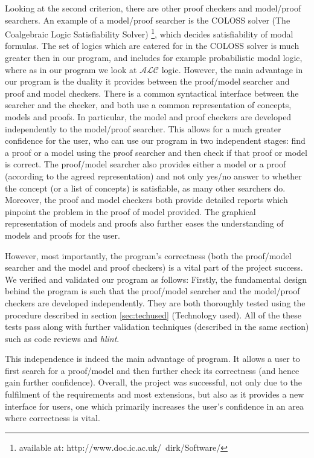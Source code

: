 


Looking at the second criterion, there are other proof checkers and model/proof searchers. An example of a model/proof searcher is the COLOSS solver (The Coalgebraic Logic Satisfiability Solver) \footnote{available at: http://www.doc.ic.ac.uk/~dirk/Software/}, which decides satisfiability of modal formulas. The set of logics which are catered for in the COLOSS solver is much greater then in our program, and includes for example probabilistic modal logic, where as in our program we look at $\mathcal{ALC}$ logic. However, the main advantage in our program is the duality it provides between the proof/model searcher and proof and model checkers. There is a common syntactical interface between the searcher and the checker, and both use a common representation of concepts, models and proofs. In particular, the model and proof checkers are developed independently to the model/proof searcher. This allows for a much greater confidence for the user, who can use our program in two independent stages: find a proof or a model using the proof searcher and then check if that proof or model is correct. The proof/model searcher also provides either a model or a proof (according to the agreed representation) and not only yes/no answer to whether the concept (or a list of concepts) is satisfiable, as many other searchers do. Moreover, the proof and model checkers both provide detailed reports which pinpoint the problem in the proof of model provided. The graphical representation of models and proofs also further eases the understanding of models and proofs for the user.

However, most importantly, the program's correctness (both the proof/model searcher and the model and proof checkers) is a vital part of the project success. We verified and validated our program as follows: Firstly, the fundamental design behind the program is such that the proof/model searcher and the model/proof checkers are developed independently. They are both thoroughly tested using the procedure described in section \ref{sec:techused} (Technology used). All of the these tests pass along with further validation techniques (described in the same section) such as code reviews and \emph{hlint}.

This independence is indeed the main advantage of program. It allows a user to first search for a proof/model and then further check its correctness (and hence gain further confidence). Overall, the project was successful, not only due to the fulfilment of the requirements and most extensions, but also as it provides a new interface for users, one which primarily increases the user's confidence in an area where correctness is vital. 


